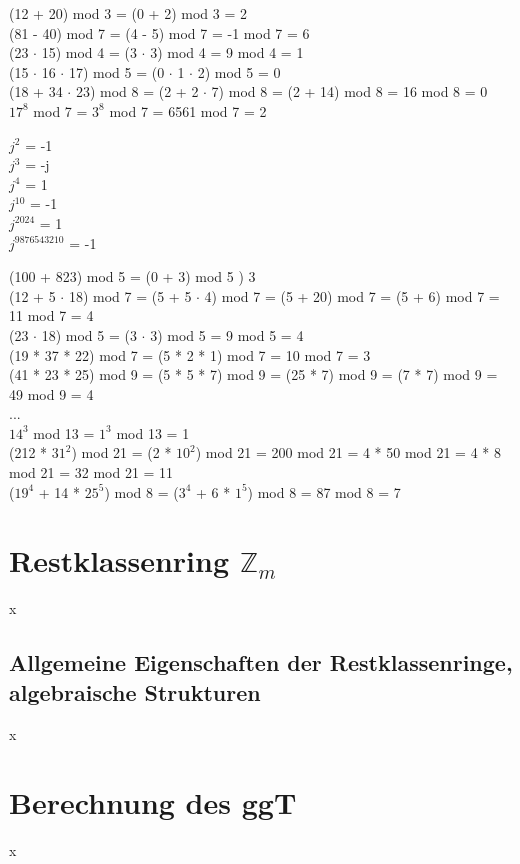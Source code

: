 	(12 + 20) mod 3 = (0 + 2) mod 3 = 2 \\
	(81 - 40) mod 7 = (4 - 5) mod 7 = -1 mod 7 = 6 \\
	(23 $\cdot$ 15) mod 4 = (3 $\cdot$ 3) mod 4 = 9 mod 4 = 1 \\
	(15 $\cdot$ 16 $\cdot$ 17) mod 5 = (0 $\cdot$ 1 $\cdot$ 2) mod 5 = 0 \\
	(18 + 34 $\cdot$ 23) mod 8 = (2 + 2 $\cdot$ 7) mod 8 = (2 + 14) mod 8 = 16 mod 8 = 0 \\
	$17^8$ mod 7 = $3^8$ mod 7 = 6561 mod 7 = 2 
	
	$j^{2}$ = -1 \\
	$j^{3}$ = -j \\
	$j^{4}$ = 1 \\
	$j^{10}$ = -1 \\
	$j^{2024}$ = 1 \\
	$j^{9876543210}$ = -1
	
	(100 + 823) mod 5 = (0 + 3) mod 5 ) 3 \\
	(12 + 5 $\cdot$ 18) mod 7 = (5 + 5 $\cdot$ 4) mod 7 = (5 + 20) mod 7 = (5 + 6) mod 7 = 11 mod 7 = 4 \\
	(23 $\cdot$ 18) mod 5 = (3 $\cdot$ 3) mod 5 = 9 mod 5 = 4 \\
	(19 * 37 * 22) mod 7 = (5 * 2 * 1) mod 7 = 10 mod 7 = 3 \\
	(41 * 23 * 25) mod 9 = (5 * 5 * 7) mod 9 = (25 * 7) mod 9 = (7 * 7) mod 9 = 49 mod 9 = 4 \\
	... \\
	$14^3$ mod 13 = $1^3$ mod 13 = 1 \\
	(212 * $31^2$) mod 21 = (2 * $10^2$) mod 21 = 200 mod 21 = 4 * 50 mod 21 = 4 * 8 mod 21 = 32 mod 21 = 11 \\
	($19^4$ + 14 * $25^5$) mod 8 = ($3^4$ + 6 * $1^5$) mod 8 = 87 mod 8 = 7
\section{Restklassenring $\mathbb{Z}_m$}
x

\subsection{Allgemeine Eigenschaften der Restklassenringe, algebraische Strukturen}
x

\section{Berechnung des ggT}
x

